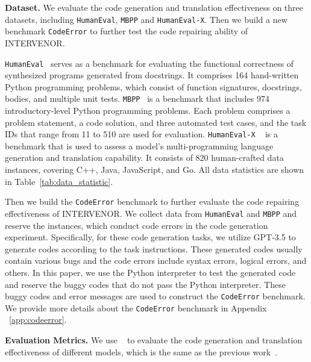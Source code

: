 \documentclass[11pt]{article}
\begin{document}
%
 \textbf{Dataset.} We evaluate the code generation and translation effectiveness on three datasets, including \texttt{HumanEval}, \texttt{MBPP} and \texttt{HumanEval-X}. Then we build a new benchmark \texttt{CodeError} to further test the code repairing ability of INTERVENOR.

\texttt{HumanEval}~\cite{chen2021evaluating} serves as a benchmark for evaluating the functional correctness of synthesized programs generated from docstrings. It comprises 164 hand-written Python programming problems, which consist of function signatures, docstrings, bodies, and multiple unit tests. \texttt{MBPP}~\cite{austin2021program} is a benchmark that includes 974 introductory-level Python programming problems. Each problem comprises a problem statement, a code solution, and three automated test cases, and the task IDs that range from 11 to 510 are used for evaluation.
\texttt{HumanEval-X} ~\cite{zheng2023codegeex} is a benchmark that is used to assess a model's multi-programming language generation and translation capability. It consists of 820 human-crafted data instances, covering C++, Java, JavaScript, and Go. All data statistics are shown in Table~\ref{tab:data_statistic}. 

Then we build the \texttt{CodeError} benchmark to further evaluate the code repairing effectiveness of INTERVENOR. We collect data from \texttt{HumanEval} and \texttt{MBPP} and reserve the instances, which conduct code errors in the code generation experiment. Specifically, for these code generation tasks, we utilize GPT-3.5 to generate codes according to the task instructions. These generated codes usually contain various bugs and the code errors include syntax errors, logical errors, and others. In this paper, we use the Python interpreter to test the generated code and reserve the buggy codes that do not pass the Python interpreter. These buggy codes and error messages are used to construct the \texttt{CodeError} benchmark. We provide more details about the \texttt{CodeError} benchmark in Appendix ~\ref{app:codeerror}.





\textbf{Evaluation Metrics. } We use ~\cite{chen2021evaluating} to evaluate the code generation and translation effectiveness of different models, which is the same as the previous work~\cite{chen2021evaluating,zheng2023codegeex,li2023structured,chen2022codet,nijkamp2022codegen}.
\end{document}
